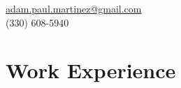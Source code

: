 \documentclass[letterpaper,11pt]{article} %
\begin{document}
\pagestyle{empty} %



\begin{center}
\href{mailto:adam.paul.martinez@gmail.com}{adam.paul.martinez@gmail.com} \\
(330) 608-5940
\end{center}


\section{Work Experience}
\end{document}
